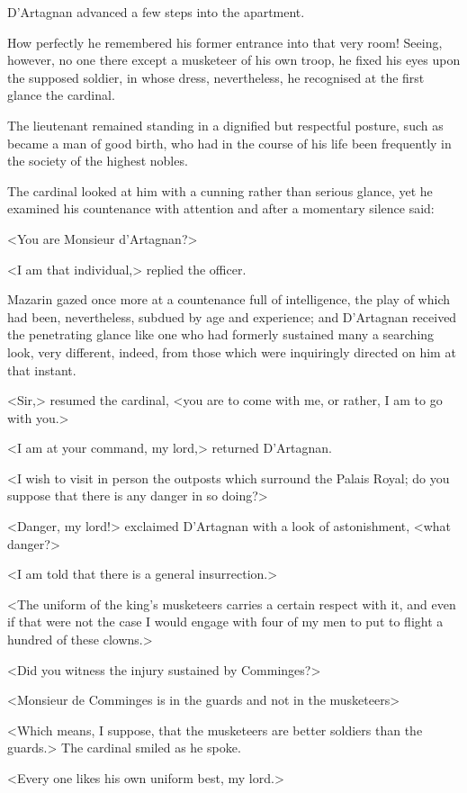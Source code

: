 D'Artagnan advanced a few steps into the apartment.

How perfectly he remembered his former entrance into that very room! Seeing, however, no one there except a musketeer of his own troop, he fixed his eyes upon the supposed soldier, in whose dress, nevertheless, he recognised at the first glance the cardinal.

The lieutenant remained standing in a dignified but respectful posture, such as became a man of good birth, who had in the course of his life been frequently in the society of the highest nobles.

The cardinal looked at him with a cunning rather than serious glance, yet he examined his countenance with attention and after a momentary silence said:

<You are Monsieur d'Artagnan?>

<I am that individual,> replied the officer.

Mazarin gazed once more at a countenance full of intelligence, the play of which had been, nevertheless, subdued by age and experience; and D'Artagnan received the penetrating glance like one who had formerly sustained many a searching look, very different, indeed, from those which were inquiringly directed on him at that instant.

<Sir,> resumed the cardinal, <you are to come with me, or rather, I am to go with you.>

<I am at your command, my lord,> returned D'Artagnan.

<I wish to visit in person the outposts which surround the Palais Royal; do you suppose that there is any danger in so doing?>

<Danger, my lord!> exclaimed D'Artagnan with a look of astonishment, <what danger?>

<I am told that there is a general insurrection.>

<The uniform of the king's musketeers carries a certain respect with it, and even if that were not the case I would engage with four of my men to put to flight a hundred of these clowns.>

<Did you witness the injury sustained by Comminges?>

<Monsieur de Comminges is in the guards and not in the musketeers\longdash>

<Which means, I suppose, that the musketeers are better soldiers than the guards.> The cardinal smiled as he spoke.

<Every one likes his own uniform best, my lord.>

